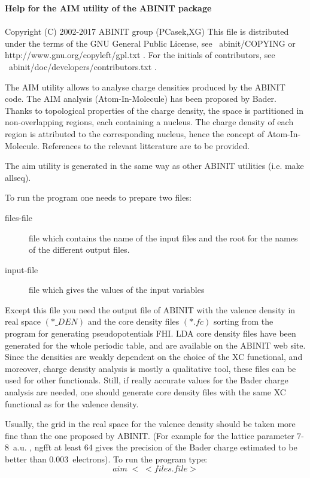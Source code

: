 \documentclass[11pt]{article}
\begin{document}
{\Huge \bf Help for the AIM utility of the ABINIT package} \\ \\

     Copyright (C) 2002-2017 ABINIT group (PCasek,XG)
     This file is distributed under the terms of the
     GNU General Public License, see ~abinit/COPYING
     or http://www.gnu.org/copyleft/gpl.txt .
     For the initials of contributors, see ~abinit/doc/developers/contributors.txt .

The AIM utility allows to analyse charge densities
produced by the ABINIT code. The AIM analysis (Atom-In-Molecule)
has been proposed by Bader. Thanks to topological
properties of the charge density, the space is partitioned
in non-overlapping regions, each containing a nucleus.
The charge density of each region is attributed to the
corresponding nucleus, hence the concept of Atom-In-Molecule.
References to the relevant litterature are to be provided.

The aim utility is generated in the same way as other
ABINIT utilities (i.e. make allseq).

To run the program one needs to prepare two files:
\begin{description}
\item [files-file] file which contains the name of the input files and the
root for the names of the different output files.
\item [input-file] file which gives the values of the input variables
\end{description}
Except this file you need the output file of ABINIT with the valence
density in real space $(*\_DEN)$ and the core density files $(*.fc)$ sorting
from the program for generating pseudopotentials FHI.
LDA core density files have been generated for the
whole periodic table, and are available on the ABINIT web site.
Since the densities are weakly dependent on the choice of the
XC functional, and moreover, charge density analysis
is mostly a qualitative tool, these files can be used
for other functionals. Still, if really accurate
values for the Bader charge analysis are needed, one should
generate core density files with the same XC functional as
for the valence density.

Usually, the grid in the real space for the valence density should be
taken more fine than the one proposed by ABINIT.
(For example for the lattice parameter 7-8~a.u. , ngfft at least 64
gives the precision of the Bader charge estimated to be better
than 0.003~electrons).
To run the program type: $$aim\; < \; <files.file> $$
\end{document}
